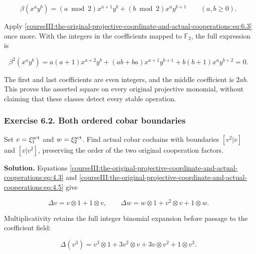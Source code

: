 \begin{equation}
\beta(x^a y^b)
    =(a\bmod2)x^{a+1}y^b+(b\bmod2)x^a y^{b+1}
       \qquad(a,b\geq0).
 \label{courseIII:the-original-projective-coordinate-and-actual-cooperations:eq:6.3}
\end{equation}

Apply \eqref{courseIII:the-original-projective-coordinate-and-actual-cooperations:eq:6.3} once more. With the integers in the coefficients mapped to \(\mathbb F_2\), the full expression is

\begin{equation}
\beta^2(x^a y^b)
   =a(a+1)x^{a+2}y^b+(ab+ba)x^{a+1}y^{b+1}
      +b(b+1)x^a y^{b+2}=0.
 \label{courseIII:the-original-projective-coordinate-and-actual-cooperations:eq:6.4}
\end{equation}

The first and last coefficients are even integers, and the middle coefficient is \(2ab\). This proves the asserted square on every original projective monomial, without claiming that these classes detect every stable operation.

\subsubsection{Exercise 6.2. Both ordered cobar boundaries}
\label{courseIII:the-original-projective-coordinate-and-actual-cooperations:exercise-6.2}

\label{courseIII:projective-coop:6.2}

Set \(v=\xi_1^{\rm act}\) and \(w=\xi_2^{\rm act}\). Find actual cobar cochains with boundaries \([v^2|v]\) and \([v|v^2]\), preserving the order of the two original cooperation factors.

\textbf{Solution.} Equations \eqref{courseIII:the-original-projective-coordinate-and-actual-cooperations:eq:4.3} and \eqref{courseIII:the-original-projective-coordinate-and-actual-cooperations:eq:4.5} give

\begin{equation}
\Delta v=v\otimes1+1\otimes v,
 \qquad
 \Delta w=w\otimes1+v^2\otimes v+1\otimes w.
 \label{courseIII:the-original-projective-coordinate-and-actual-cooperations:eq:6.5}
\end{equation}

Multiplicativity retains the full integer binomial expansion before passage to the coefficient field:

\begin{equation}
\Delta(v^3)=v^3\otimes1+3v^2\otimes v
                  +3v\otimes v^2+1\otimes v^3.
 \label{courseIII:the-original-projective-coordinate-and-actual-cooperations:eq:6.6}
\end{equation}

